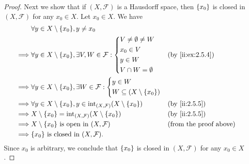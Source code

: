 \begin{proof}
  Next we show that if \((X, \mathcal{F})\) is a Hausdorff space, then \(\left\lbrace x_0\right\rbrace\) is closed in \((X, \mathcal{F})\) for any \(x_0 \in X\).
  Let \(x_0 \in X\).
  We have
  \begin{align*}
             & \forall y \in X \setminus \set{x_0}, y \neq x_0                                                                                    \\
    \implies & \forall y \in X \setminus \set{x_0}, \exists V, W \in \mathcal{F} : \begin{dcases}
                                                                                     V \neq \emptyset \neq W \\
                                                                                     x_0 \in V               \\
                                                                                     y \in W                 \\
                                                                                     V \cap W = \emptyset
                                                                                   \end{dcases}              &  & \by{ii:ex:2.5.4}                   \\
    \implies & \forall y \in X \setminus \set{x_0}, \exists W \in \mathcal{F} : \begin{dcases}
                                                                                  y \in W \\
                                                                                  W \subseteq (X \setminus \set{x_0})
                                                                                \end{dcases}                                \\
    \implies & \forall y \in X \setminus \set{x_0}, y \in \text{int}_{(X, \mathcal{F})}(X \setminus \set{x_0}) &  & \by{ii:2.5.5}                    \\
    \implies & X \setminus \set{x_0} = \text{int}_{(X, \mathcal{F})}(X \setminus \set{x_0})                    &  & \by{ii:2.5.5}                    \\
    \implies & X \setminus \set{x_0} \text{ is open in } (X, \mathcal{F})                                      &  & \text{(from the proof above)} \\
    \implies & \set{x_0} \text{ is closed in } (X, \mathcal{F}).
  \end{align*}
  Since \(x_0\) is arbitrary, we conclude that \(\left\lbrace x_0\right\rbrace\) is closed in \((X, \mathcal{F})\) for any \(x_0 \in X\).


\end{proof}
